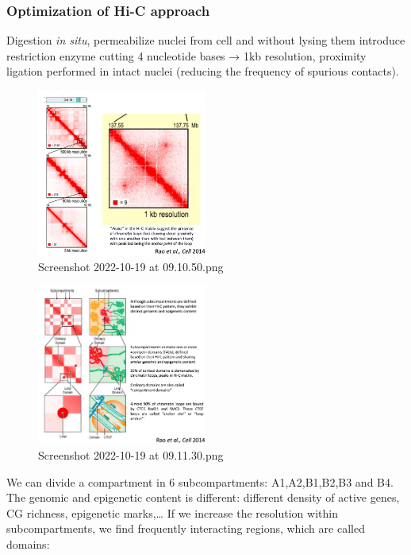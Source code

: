 \hypertarget{optimization-of-hi-c-approach}{%
\subsubsection{Optimization of Hi-C approach}\label{optimization-of-hi-c-approach}}

Digestion \emph{in situ}, permeabilize nuclei from cell and without lysing them introduce restriction enzyme cutting 4 nucleotide bases → 1kb resolution, proximity ligation performed in intact nuclei (reducing the frequency of spurious contacts).

\begin{figure}
\centering
\includegraphics[width=0.5\textwidth]{../_resources/Screenshot_2022-10-19_at_09-10-50.png}
\caption{Screenshot 2022-10-19 at 09.10.50.png}
\end{figure}

\begin{figure}
\centering
\includegraphics[width=0.5\textwidth]{../_resources/Screenshot_2022-10-19_at_09-11-30.png}
\caption{Screenshot 2022-10-19 at 09.11.30.png}
\end{figure}

We can divide a compartment in 6 subcompartments: A1,A2,B1,B2,B3 and B4. The genomic and epigenetic content is different: different density of active genes, CG richness, epigenetic marks,\ldots{} If we increase the resolution within subcompartments, we find frequently interacting regions, which are called domains:

